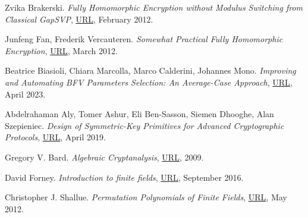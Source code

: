 \documentclass{Resources/UoBLab1}
\theoremstyle{definition}
\begin{document}
\begin{thebibliography}{10}
 Zvika Brakerski. \textit{Fully Homomorphic Encryption without Modulus Switching from Classical GapSVP}, \href{https://eprint.iacr.org/2012/078.pdf}{URL}, February 2012.

 Junfeng Fan, Frederik Vercauteren. \textit{Somewhat Practical Fully Homomorphic Encryption}, \href{https://eprint.iacr.org/2012/144.pdf}{URL}, March 2012.

 Beatrice Biasioli, Chiara Marcolla, Marco Calderini, Johannes Mono. \textit{Improving and Automating BFV Parameters Selection: An Average-Case Approach}, \href{https://eprint.iacr.org/2023/600.pdf}{URL}, April 2023.

 Abdelrahaman Aly, Tomer Ashur, Eli Ben-Sasson, Siemen Dhooghe, Alan Szepieniec. \textit{Design of Symmetric-Key Primitives for Advanced Cryptographic Protocols}, \href{https://eprint.iacr.org/2019/426.pdf}{URL}, April 2019.

 Gregory V. Bard. \textit{Algebraic Cryptanalysis}, \href{https://link.springer.com/book/10.1007/978-0-387-88757-9}{URL}, 2009.

 David Forney. \textit{Introduction to finite fields}, \href{http://web.stanford.edu/~marykw/classes/CS250_W19/readings/Forney_Introduction_to_Finite_Fields.pdf}{URL}, September 2016.

 Christopher J. Shallue. \textit{Permutation Polynomials of Finite Fields}, \href{https://arxiv.org/pdf/1211.6044.pdf}{URL}, May 2012.

\end{thebibliography}
\end{document}
